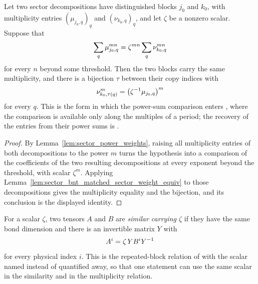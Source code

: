 \begin{lemma}%
    \label{lem:matched_sector_weight_pow_equiv_period}
    \leanok
    Let two sector decompositions have distinguished blocks $j_0$ and $k_0$,
    with multiplicity entries $(\mu_{j_0,q})_q$ and $(\nu_{k_0,q})_q$, and let
    $\zeta$ be a nonzero scalar. Suppose that
    \begin{align}
        \sum_{q}\mu_{j_0,q}^{mn}
        =\zeta^{mn}\sum_{q}\nu_{k_0,q}^{mn}
        \notag
    \end{align}
    for every $n$ beyond some threshold. Then the two blocks carry the same
    multiplicity, and there is a bijection $\tau$ between their copy indices
    with
    \begin{align}
        \nu_{k_0,\tau(q)}^{m}=\bigl(\zeta^{-1}\mu_{j_0,q}\bigr)^{m}
        \notag
    \end{align}
    for every $q$. This is the form in which the power-sum comparison enters
    \cite[lines~681--684]{DeLasCuevas2017Irreducible}, where the comparison is
    available only along the multiples of a period; the recovery of the
    entries from their power sums is
    \cite[lines~537--569]{DeLasCuevas2017Irreducible}.
\end{lemma}

\begin{proof}\leanok
    By Lemma~\ref{lem:sector_power_weights}, raising all multiplicity entries
    of both decompositions to the power $m$ turns the hypothesis into a
    comparison of the coefficients of the two resulting decompositions at
    every exponent beyond the threshold, with scalar $\zeta^{m}$. Applying
    Lemma~\ref{lem:sector_bnt_matched_sector_weight_equiv} to those
    decompositions gives the multiplicity equality and the bijection, and its
    conclusion is the displayed identity.
\end{proof}

\begin{definition}%
    \label{def:scalar_gauge_equiv}
    \leanok
    For a scalar $\zeta$, two tensors $A$ and $B$ are \emph{similar carrying
        $\zeta$} if they have the same bond dimension and there is an invertible
    matrix $Y$ with
    \begin{align}
        A^i=\zeta\,YB^iY^{-1}
        \notag
    \end{align}
    for every physical index $i$. This is the repeated-block relation of
    \cite[def.~\emph{repeated}, lines~276--284]{DeLasCuevas2017Irreducible}
    with the scalar named instead of quantified away, so that one statement can
    use the same scalar in the similarity and in the multiplicity relation.
\end{definition}

